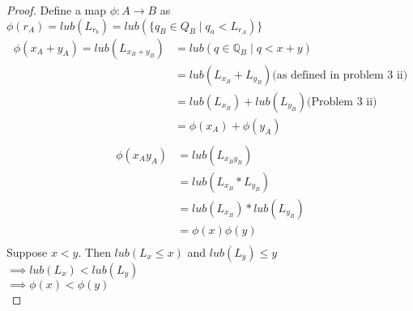 \documentclass[12pt, a4paper]{article}
\begin{document}
\begin{proof}
            Define a map $\phi: A \rightarrow B$ as $\phi(r_A) = lub(L_{r_b}) = lub(\{q_B\in Q_B \mid q_a < L_{r_A})\}$
            \begin{align*}
            \phi(x_A+y_A) = lub(L_{x_B+y_B}) &= lub({q \in \mathbb{Q}_B \mid q < x+y})\\
           &= lub(L_{x_B}+L_{y_B}) \text{(as defined in problem 3 ii)}\\
            &=lub(L_{x_B})+lub(L_{y_B}) \text{(Problem 3 ii)}\\
            &=\phi(x_A)+\phi(y_A)\\
            \end{align*}
            \begin{align*}
                \phi(x_Ay_A)&=lub(L_{x_By_B})\\
                &=lub(L_{x_B}*L_{y_B})\\
                &=lub(L_{x_B})*lub(L_{y_B})\\
                &=\phi(x)\phi(y)\\
            \end{align*}
                Suppose $x < y$. Then $lub(L_{x} \le x)$ and $lub(L_y) \le y$\\
                $\implies lub(L_x) < lub(L_y)$\\
                $\implies \phi(x) < \phi(y)$\\
        \end{proof}
\end{document}
